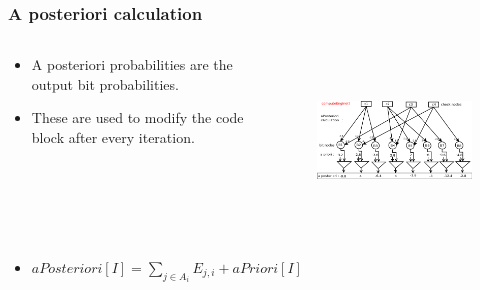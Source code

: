 \documentclass[xcolor=dvipsname]
{beamer}
\begin{document}
\begin{frame}[t]
\frametitle{ A posteriori calculation }  
\vspace{-5mm}
\begin{columns}[totalwidth=\textwidth]
	\begin{column}{0.3\textwidth}
	\centering
	\begin{itemize}
	\item A posteriori probabilities are the output bit probabilities.
	\item These are used to modify the code block after every iteration.
	\end{itemize}
 
			
	\end{column}%
	   		
	\begin{column}{0.7\textwidth}
	\centering
	\begin{figure}
	\includegraphics[height=4.5cm,width=8cm]{minSum5}
	\end{figure}
	\end{column}%
\end{columns}

\begin{itemize}

\item \alert{$ aPosteriori[I] = \sum_{j\in A_i} E_{j,i} + aPriori[I] $}
\end{itemize}
\end{frame}
\end{document}
